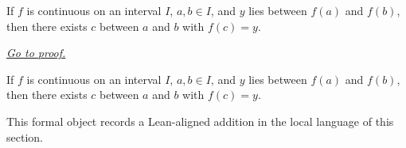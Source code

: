 \begin{dependencies}
\NoLocalDependencies
\end{dependencies}
\begin{theorem}
\label{thm:continuous-implies-darboux-property}
If $f$ is continuous on an interval $I$, $a,b\in I$, and $y$ lies between $f(a)$ and $f(b)$, then there exists $c$ between $a$ and $b$ with $f(c)=y$.

\smallskip
\noindent
\hyperref[prf:continuous-implies-darboux-property]{\textit{Go to proof.}}
\end{theorem}

\begin{remark*}
If $f$ is continuous on an interval $I$, $a,b\in I$, and $y$ lies between $f(a)$ and $f(b)$, then there exists $c$ between $a$ and $b$ with $f(c)=y$.
\end{remark*}

\begin{remark*}[Interpretation]
This formal object records a Lean-aligned addition in the local language of this section.
\end{remark*}

\begin{dependencies}
\NoLocalDependencies
\end{dependencies}
